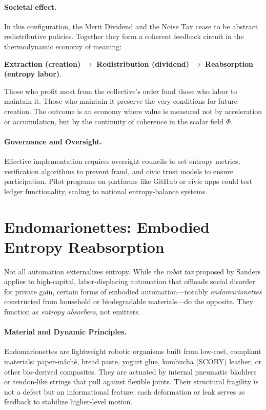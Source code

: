 \documentclass[12pt]{article}
\begin{document}
\paragraph{Societal effect.}
In this configuration, the Merit Dividend and the Noise Tax cease to be abstract redistributive policies. Together they form a coherent feedback circuit in the thermodynamic economy of meaning:
\begin{center}
\textbf{Extraction (creation)} $\rightarrow$ \textbf{Redistribution (dividend)} $\rightarrow$ \textbf{Reabsorption (entropy labor)}.
\end{center}

Those who profit most from the collective’s order fund those who labor to maintain it. Those who maintain it preserve the very conditions for future creation. The outcome is an economy where value is measured not by acceleration or accumulation, but by the continuity of coherence in the scalar field $\Phi$.

\paragraph{Governance and Oversight.}
Effective implementation requires oversight councils to set entropy metrics, verification algorithms to prevent fraud, and civic trust models to ensure participation. Pilot programs on platforms like GitHub or civic apps could test ledger functionality, scaling to national entropy-balance systems.

\section{Endomarionettes: Embodied Entropy Reabsorption}
Not all automation externalizes entropy. While the \emph{robot tax} proposed by Sanders applies to high-capital, labor-displacing automation that offloads social disorder for private gain, certain forms of embodied automation—notably \emph{endomarionettes} constructed from household or biodegradable materials—do the opposite. They function as \emph{entropy absorbers}, not emitters.

\paragraph{Material and Dynamic Principles.}
Endomarionettes are lightweight robotic organisms built from low-cost, compliant materials: paper-m\^{a}ch\'e, bread paste, yogurt glue, kombucha (SCOBY) leather, or other bio-derived composites. They are actuated by internal pneumatic bladders or tendon-like strings that pull against flexible joints. Their structural fragility is not a defect but an informational feature: each deformation or leak serves as feedback to stabilize higher-level motion.
\end{document}
